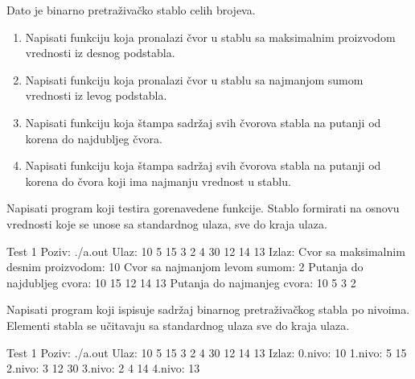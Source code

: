 \begin{Answer}[ref=710]
\end{Answer}




\begin{Exercise}[label=711]
Dato je binarno pretraživačko stablo celih brojeva.
\begin{enumerate}
\item Napisati funkciju koja pronalazi čvor u stablu sa maksimalnim proizvodom vrednosti iz desnog podstabla.
\item Napisati funkciju koja pronalazi čvor u stablu sa najmanjom sumom vrednosti iz levog podstabla.
\item Napisati funkciju  koja štampa sadržaj svih čvorova stabla na putanji od korena do najdubljeg čvora.
\item Napisati funkciju koja štampa sadržaj svih čvorova stabla na putanji od korena do čvora koji ima najmanju vrednost u stablu.
\end{enumerate}
Napisati program koji testira gorenavedene funkcije. Stablo formirati na osnovu vrednosti koje se unose
sa standardnog ulaza, sve do kraja ulaza.


\begin{maxitest}
\begin{test}{Test 1}
Poziv: ./a.out
Ulaz: 
	10 5 15 3 2 4 30 12 14 13
Izlaz: 
	Cvor sa maksimalnim desnim proizvodom: 10
	Cvor sa najmanjom levom sumom: 2
	Putanja do najdubljeg cvora: 10 15 12 14 13
	Putanja do najmanjeg cvora: 10 5 3 2
\end{test}
\end{maxitest}
\end{Exercise}

\begin{Answer}[ref=711]
\end{Answer}


\begin{Exercise}[label=712]
Napisati program koji ispisuje sadržaj binarnog pretraživačkog stabla po nivoima. Elementi stabla se učitavaju sa standardnog ulaza sve do kraja ulaza.

\begin{maxitest}
\begin{test}{Test 1}
Poziv: ./a.out
Ulaz: 
	10 5 15 3 2 4 30 12 14 13
Izlaz: 
	0.nivo: 10
	1.nivo: 5 15
	2.nivo: 3 12 30
	3.nivo: 2 4 14
	4.nivo: 13
\end{test}
\end{maxitest}

\end{Exercise}

